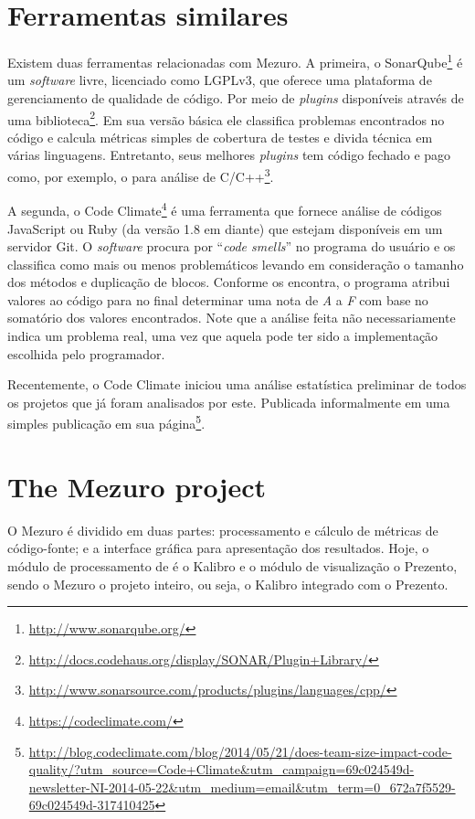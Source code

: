 \documentclass{llncs}
\begin{document}
\section{Ferramentas similares}
Existem duas ferramentas relacionadas com Mezuro. A primeira, o
SonarQube\footnote{\url{http://www.sonarqube.org/}} é um \textit{software}
livre, licenciado como LGPLv3, que oferece uma plataforma de gerenciamento de
qualidade de código. Por meio de \textit{plugins} disponíveis através de uma
biblioteca\footnote{\url{http://docs.codehaus.org/display/SONAR/Plugin+Library/}}.
Em sua versão básica ele classifica problemas encontrados no código e calcula
métricas simples de cobertura de testes e divida técnica em várias linguagens.
Entretanto, seus melhores \textit{plugins} tem código fechado e pago como, por
exemplo, o para análise de
C/C++\footnote{\url{http://www.sonarsource.com/products/plugins/languages/cpp/}}.

A segunda, o Code Climate\footnote{\url{https://codeclimate.com/}} é uma
ferramenta que fornece análise de códigos JavaScript ou Ruby (da versão 1.8 em
diante) que estejam disponíveis em um servidor Git. O \textit{software} procura
por ``\textit{code smells}'' no programa do usuário e os classifica como mais
ou menos problemáticos levando em consideração o tamanho dos métodos e
duplicação de blocos. Conforme os encontra, o programa atribui valores ao
código para no final determinar uma nota de \textit{A} a \textit{F} com base no
somatório dos valores encontrados. Note que a análise feita não necessariamente
indica um problema real, uma vez que aquela pode ter sido a implementação
escolhida pelo programador.

Recentemente, o Code Climate iniciou uma análise estatística preliminar de
todos os projetos que já foram analisados por este. Publicada informalmente em
uma simples publicação em sua
página\footnote{\url{http://blog.codeclimate.com/blog/2014/05/21/does-team-size-impact-code-quality/?utm\_source=Code+Climate&utm\_campaign=69c024549d-newsletter-NI-2014-05-22&utm\_medium=email&utm\_term=0\_672a7f5529-69c024549d-317410425}}.

\section{The Mezuro project}
\label{sec:mezuro}

O Mezuro é dividido em duas partes: processamento e cálculo de métricas de
código-fonte; e a interface gráfica para apresentação dos resultados. Hoje, o
módulo de processamento de é o Kalibro e o módulo de visualização o Prezento,
sendo o Mezuro o projeto inteiro, ou seja, o Kalibro integrado com o Prezento.
\end{document}
